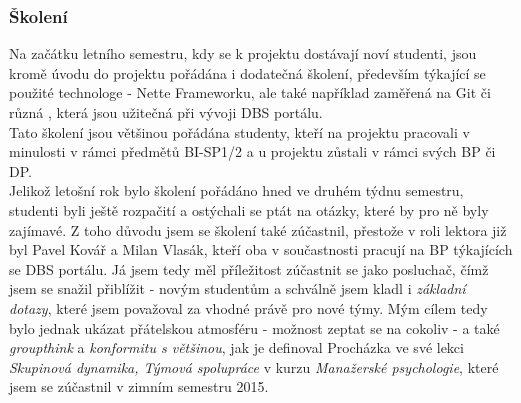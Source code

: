 \subsubsection{Školení}
Na začátku letního semestru, kdy se k projektu dostávají noví studenti, jsou kromě úvodu do projektu pořádána i dodatečná školení, především týkající se použité technologe - Nette Frameworku, ale také například zaměřená na Git či různá , která jsou užitečná při vývoji DBS portálu.\\
Tato školení jsou většinou pořádána studenty, kteří na projektu pracovali v minulosti v rámci předmětů BI-SP1/2 a u projektu zůstali v rámci svých BP či DP.\\
Jelikož letošní rok bylo školení pořádáno hned ve druhém týdnu semestru, studenti byli ještě rozpačití a ostýchali se ptát na otázky, které by pro ně byly zajímavé. Z toho důvodu jsem se školení také zúčastnil, přestože v roli lektora již byl Pavel Kovář a Milan Vlasák, kteří oba v součastnosti pracují na BP týkajících se DBS portálu. Já jsem tedy měl příležitost zúčastnit se jako posluchač, čímž jsem se snažil přiblížit  - novým studentům a schválně jsem kladl i \emph{základní dotazy}, které jsem považoval za vhodné právě pro nové týmy. Mým cílem tedy bylo jednak ukázat přátelskou atmosféru - možnost zeptat se na cokoliv - a také  \emph{groupthink} a \emph{konformitu s většinou}, jak je definoval Procházka \cite{prochazka} ve své lekci \emph{Skupinová dynamika, Týmová spolupráce} v kurzu \emph{Manažerské psychologie}, které jsem se zúčastnil v zimním semestru 2015.
